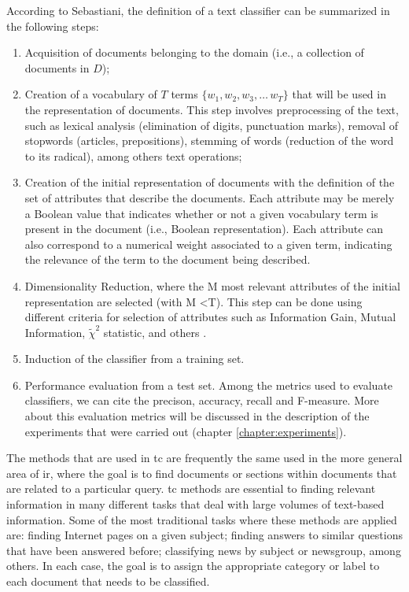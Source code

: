 According to Sebastiani\cite{Sebastiani:2002}, the definition of a text classifier can be summarized in the following steps:

\begin{enumerate}
\item  Acquisition of documents belonging to the domain (i.e.,
a collection of documents in $D$);
\item Creation of a vocabulary of $T$ terms  $\{w_1,w_2,w_3,\ldots\,w_T\}$ that will be used in the representation of documents. This step involves preprocessing of the text, such as lexical analysis (elimination of digits, punctuation marks), removal of stopwords (articles, prepositions), stemming of words (reduction of the word to its radical), among others text operations;

\item Creation of the initial representation of documents with the definition of the set of attributes that describe the documents. Each attribute may be merely a Boolean value that indicates whether or not a given vocabulary term is present in the document (i.e., Boolean representation).  Each attribute can also correspond to a numerical weight associated to a given term, indicating the relevance of the term to the document being described. 

\item Dimensionality Reduction, where the M most relevant attributes of the initial representation are selected (with M <T). This step can be done using different criteria for selection of attributes such as Information Gain, Mutual Information, $\tilde{\chi}^2$ statistic, and others \cite{Yang:1997}.

\item Induction of the classifier from a training set. %

\item Performance evaluation from a test set. Among the metrics used to evaluate classifiers, we can cite the precison, accuracy,  recall and F-measure. More about this evaluation metrics will be discussed in the description of the experiments that were carried out (chapter \ref{chapter:experiments}).

\end{enumerate}




The methods that are used in \gls{tc} are frequently the same used in the more general area of \gls{ir}, where the goal is to find documents or sections within documents that are related to a particular query. \gls{tc} methods are essential to finding relevant information in many different tasks that deal with large volumes of text-based information. Some of the most traditional tasks where these methods are applied are: finding Internet pages on a given subject; finding answers to similar questions that have been answered before; classifying news by subject or newsgroup, among others. In each case, the goal is to assign the appropriate category or label to each document that needs to be classified.

